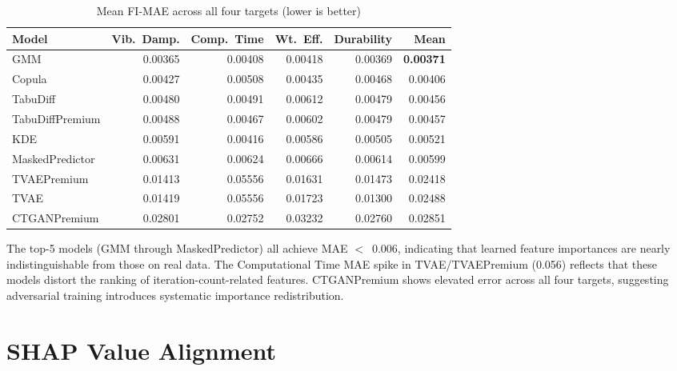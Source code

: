 \documentclass[12pt,a4paper]{article}
\begin{document}
\begin{table}[H]
\centering
\caption{Mean FI-MAE across all four targets (lower is better)}
\label{tab:fi_mae}
\renewcommand{\arraystretch}{1.25}
\begin{tabular}{lrrrrr}
\toprule
\textbf{Model} & \textbf{Vib.\ Damp.} & \textbf{Comp.\ Time} & \textbf{Wt.\ Eff.} & \textbf{Durability} & \textbf{Mean} \\
\midrule
GMM             & 0.00365 & 0.00408 & 0.00418 & 0.00369 & \textbf{0.00371} \\
Copula          & 0.00427 & 0.00508 & 0.00435 & 0.00468 & 0.00406 \\
TabuDiff        & 0.00480 & 0.00491 & 0.00612 & 0.00479 & 0.00456 \\
TabuDiffPremium & 0.00488 & 0.00467 & 0.00602 & 0.00479 & 0.00457 \\
KDE             & 0.00591 & 0.00416 & 0.00586 & 0.00505 & 0.00521 \\
MaskedPredictor & 0.00631 & 0.00624 & 0.00666 & 0.00614 & 0.00599 \\
TVAEPremium     & 0.01413 & 0.05556 & 0.01631 & 0.01473 & 0.02418 \\
TVAE            & 0.01419 & 0.05556 & 0.01723 & 0.01300 & 0.02488 \\
CTGANPremium    & 0.02801 & 0.02752 & 0.03232 & 0.02760 & 0.02851 \\
\bottomrule
\end{tabular}
\end{table}

\begin{tcolorbox}[insightbox, title={Interpretation}]
The top-5 models (GMM through MaskedPredictor) all achieve MAE $<$~0.006, indicating that learned feature importances are nearly indistinguishable from those on real data. The Computational Time MAE spike in TVAE/TVAEPremium (0.056) reflects that these models distort the ranking of iteration-count-related features. CTGANPremium shows elevated error across all four targets, suggesting adversarial training introduces systematic importance redistribution.
\end{tcolorbox}

\section{SHAP Value Alignment}
\end{document}
